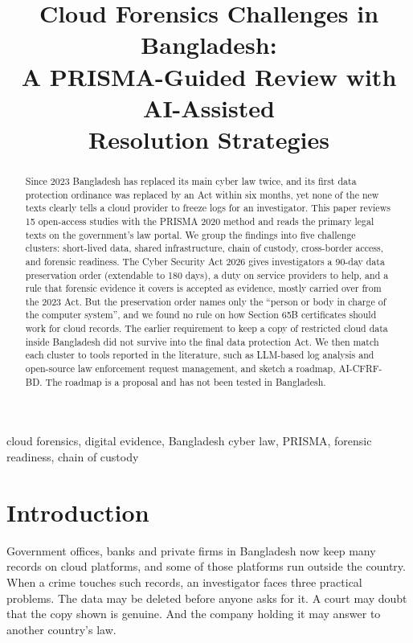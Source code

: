 \documentclass[conference]{IEEEtran}
\begin{document}
\title{Cloud Forensics Challenges in Bangladesh:\\
A PRISMA-Guided Review with AI-Assisted\\ Resolution Strategies}

\author{
}

\maketitle

\begin{abstract}
Since 2023 Bangladesh has replaced its main cyber law twice, and its first data protection ordinance was replaced by an Act within six months, yet none of the new texts clearly tells a cloud provider to freeze logs for an investigator. This paper reviews 15 open-access studies with the PRISMA 2020 method and reads the primary legal texts on the government's law portal. We group the findings into five challenge clusters: short-lived data, shared infrastructure, chain of custody, cross-border access, and forensic readiness. The Cyber Security Act 2026 gives investigators a 90-day data preservation order (extendable to 180 days), a duty on service providers to help, and a rule that forensic evidence it covers is accepted as evidence, mostly carried over from the 2023 Act. But the preservation order names only the ``person or body in charge of the computer system'', and we found no rule on how Section 65B certificates should work for cloud records. The earlier requirement to keep a copy of restricted cloud data inside Bangladesh did not survive into the final data protection Act. We then match each cluster to tools reported in the literature, such as LLM-based log analysis and open-source law enforcement request management, and sketch a roadmap, AI-CFRF-BD. The roadmap is a proposal and has not been tested in Bangladesh.
\end{abstract}

\begin{IEEEkeywords}
cloud forensics, digital evidence, Bangladesh cyber law, PRISMA, forensic readiness, chain of custody
\end{IEEEkeywords}

\section{Introduction}
Government offices, banks and private firms in Bangladesh now keep many records on cloud platforms, and some of those platforms run outside the country. When a crime touches such records, an investigator faces three practical problems. The data may be deleted before anyone asks for it. A court may doubt that the copy shown is genuine. And the company holding it may answer to another country's law.
\end{document}
